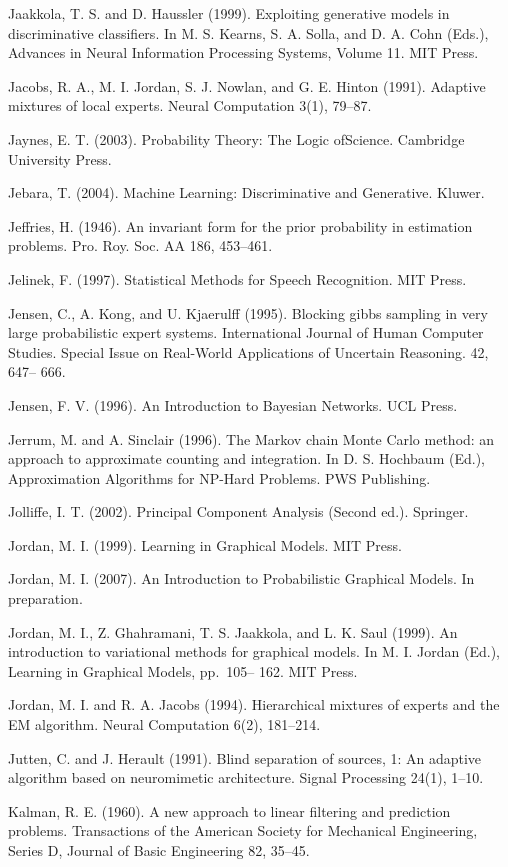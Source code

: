 \documentclass[
  10
]{article}
\begin{document}
Jaakkola, T. S. and D. Haussler (1999). Exploiting generative models in
discriminative classifiers. In M. S. Kearns, S. A. Solla, and D. A. Cohn
(Eds.), Advances in Neural Information Processing Systems, Volume 11.
MIT Press.

Jacobs, R. A., M. I. Jordan, S. J. Nowlan, and G. E. Hinton (1991).
Adaptive mixtures of local experts. Neural Computation 3(1), 79--87.

Jaynes, E. T. (2003). Probability Theory: The Logic ofScience. Cambridge
University Press.

Jebara, T. (2004). Machine Learning: Discriminative and Generative.
Kluwer.

Jeffries, H. (1946). An invariant form for the prior probability in
estimation problems. Pro. Roy. Soc. AA 186, 453--461.

Jelinek, F. (1997). Statistical Methods for Speech Recognition. MIT
Press.

Jensen, C., A. Kong, and U. Kjaerulff (1995). Blocking gibbs sampling in
very large probabilistic expert systems. International Journal of Human
Computer Studies. Special Issue on Real-World Applications of Uncertain
Reasoning. 42, 647-- 666.

Jensen, F. V. (1996). An Introduction to Bayesian Networks. UCL Press.

Jerrum, M. and A. Sinclair (1996). The Markov chain Monte Carlo method:
an approach to approximate counting and integration. In D. S. Hochbaum
(Ed.), Approximation Algorithms for NP-Hard Problems. PWS Publishing.

Jolliffe, I. T. (2002). Principal Component Analysis (Second ed.).
Springer.

Jordan, M. I. (1999). Learning in Graphical Models. MIT Press.

Jordan, M. I. (2007). An Introduction to Probabilistic Graphical Models.
In preparation.

Jordan, M. I., Z. Ghahramani, T. S. Jaakkola, and L. K. Saul (1999). An
introduction to variational methods for graphical models. In M. I.
Jordan (Ed.), Learning in Graphical Models, pp.~105-- 162. MIT Press.

Jordan, M. I. and R. A. Jacobs (1994). Hierarchical mixtures of experts
and the EM algorithm. Neural Computation 6(2), 181--214.

Jutten, C. and J. Herault (1991). Blind separation of sources, 1: An
adaptive algorithm based on neuromimetic architecture. Signal Processing
24(1), 1--10.

Kalman, R. E. (1960). A new approach to linear filtering and prediction
problems. Transactions of the American Society for Mechanical
Engineering, Series D, Journal of Basic Engineering 82, 35--45.
\end{document}
